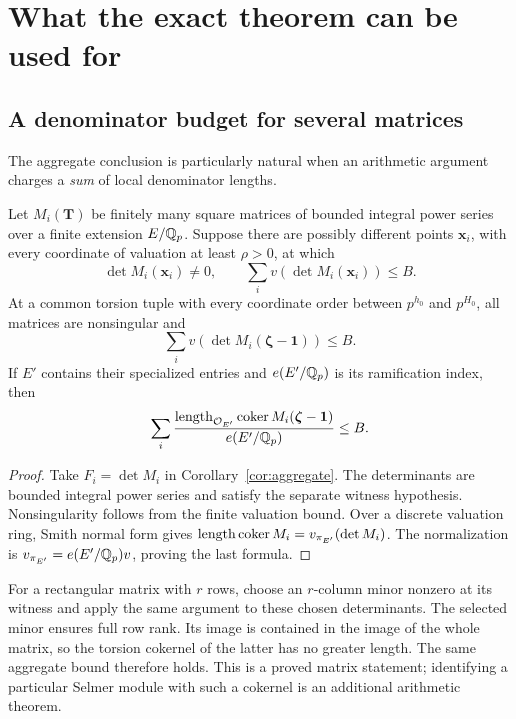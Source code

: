 \section{What the exact theorem can be used for}
\label{sec:applications}

\subsection{A denominator budget for several matrices}

The aggregate conclusion is particularly natural when an arithmetic argument
charges a \emph{sum} of local denominator lengths.

\begin{corollary}
\label{cor:matrices}
Let \(M_i(\mathbf T)\) be finitely many square matrices of bounded integral
power series over a finite extension \(E/\mathbb Q_p\). Suppose there are possibly
different points \(\mathbf x_i\), with every coordinate of valuation at
least \(\rho>0\), at which
\[
 \det M_i(\mathbf x_i)\ne0,\qquad
 \sum_i v(\det M_i(\mathbf x_i))\le B.
\]
At a common torsion tuple with every coordinate order between \(p^{h_0}\)
and \(p^{H_0}\), all matrices are nonsingular and
\[
                   \sum_i v(\det M_i(\boldsymbol\zeta-\mathbf1))\le B.
\]
If \(E'\) contains their specialized entries and \(e(E'/\mathbb Q_p)\) is its
ramification index, then
\[
 \sum_i \frac{\operatorname{length}_{\mathcal O_{E'}}
        \operatorname{coker}M_i(\boldsymbol\zeta-\mathbf1)}
               {e(E'/\mathbb Q_p)}
 \le B.
\]
\end{corollary}

\begin{proof}
Take \(F_i=\det M_i\) in Corollary~\ref{cor:aggregate}. The determinants
are bounded integral power series and satisfy the separate witness
hypothesis. Nonsingularity follows from the finite valuation bound.
Over a discrete valuation ring, Smith normal form gives
\(\operatorname{length}\operatorname{coker}M_i=v_{\pi_{E'}}(\det M_i)\).
The normalization is \(v_{\pi_{E'}}=e(E'/\mathbb Q_p)v\), proving the last
formula.
\end{proof}

For a rectangular matrix with \(r\) rows, choose an \(r\)-column minor
nonzero at its witness and apply the same argument to these chosen
determinants. The selected minor ensures full row rank. Its image is
contained in the image of the whole matrix, so the torsion cokernel of
the latter has no greater length. The same aggregate bound therefore
holds. This is a proved matrix statement; identifying a particular
Selmer module with such a cokernel is an additional arithmetic theorem.

